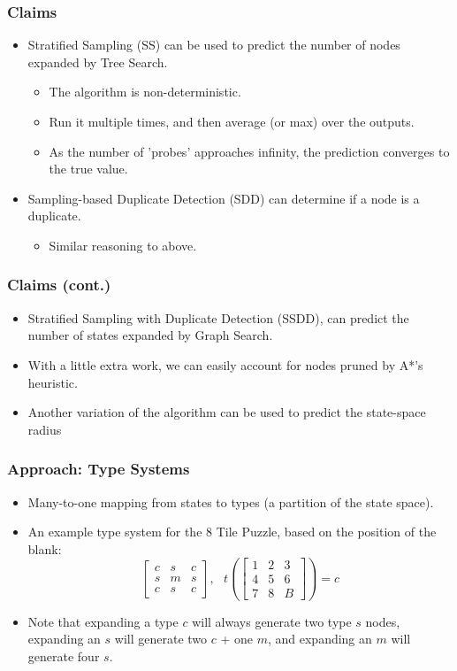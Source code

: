 \documentclass{beamer}
\begin{document}
\begin{frame}
  \frametitle{Claims}
  \begin{itemize}
  \item Stratified Sampling (SS) can be used to predict the number of nodes expanded by Tree Search.
    \begin{itemize}
    \item The algorithm is non-deterministic.
    \item Run it multiple times, and then average (or max) over the outputs.
    \item As the number of 'probes' approaches infinity, the prediction converges to the true value.
    \end{itemize}
  \item Sampling-based Duplicate Detection (SDD) can determine if a node is a duplicate.
    \begin{itemize}
    \item Similar reasoning to above.
    \end{itemize}
  \end{itemize}
\end{frame}

\begin{frame}
  \frametitle{Claims (cont.)}
  \begin{itemize}
  \item Stratified Sampling with Duplicate Detection (SSDD),
    can predict the number of states expanded by Graph Search.
  \item With a little extra work, we can easily account for nodes pruned by A*'s heuristic.
  \item Another variation of the algorithm can be used to predict the state-space radius
  \end{itemize}
\end{frame}

\begin{frame}
  \frametitle{Approach: Type Systems}
  \begin{itemize}
  \item Many-to-one mapping from states to types (a partition of the state space).
  \item An example type system for the 8 Tile Puzzle, based on the position of the blank:
    $$
    \begin{bmatrix}
      c & s & c \\
      s & m & s \\
      c & s & c
    \end{bmatrix},
    \text{ }
    t \left(
    \begin{bmatrix}
      1 & 2 & 3 \\
      4 & 5 & 6 \\
      7 & 8 & B
    \end{bmatrix}
    \right) = c
    $$
  \item
    Note that expanding a type \(c\) will always generate two type \(s\) nodes,
    expanding an \(s\) will generate two \(c\) + one \(m\),
    and expanding an \(m\) will generate four \(s\).
  \end{itemize}
\end{frame}
\end{document}
